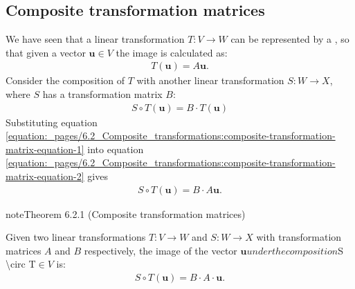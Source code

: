 \documentclass[letterpaper,10pt,english]{jupyterBook}
\begin{document}
\subsection{Composite transformation matrices}
\label{\detokenize{_pages/6.2_Composite_transformations:composite-transformation-matrices}}
\sphinxAtStartPar
We have seen that a linear transformation \(T: V \to W\) can be represented by a {\hyperref[\detokenize{_pages/6.1_Transformation_matrices:transformation-matrix-definition}]{}}, so that given a vector \(\mathbf{u} \in V\) the image is calculated as:
\begin{equation}\label{equation:_pages/6.2_Composite_transformations:composite-transformation-matrix-equation-1}
\begin{split} T(\mathbf{u}) = A \mathbf{u}. \end{split}
\end{equation}
\sphinxAtStartPar
Consider the composition of \(T\) with another linear transformation \(S: W \to X\), where \(S\) has a transformation matrix \(B\):
\begin{equation}\label{equation:_pages/6.2_Composite_transformations:composite-transformation-matrix-equation-2}
\begin{split} S \circ T(\mathbf{u}) = B \cdot T(\mathbf{u}) \end{split}
\end{equation}
\sphinxAtStartPar
Substituting equation \eqref{equation:_pages/6.2_Composite_transformations:composite-transformation-matrix-equation-1} into equation \eqref{equation:_pages/6.2_Composite_transformations:composite-transformation-matrix-equation-2} gives
\begin{equation*}
\begin{split} S \circ T (\mathbf{u}) = B \cdot A \mathbf{u}. \end{split}
\end{equation*}\label{_pages/6.2_Composite_transformations:composite-transformation-matrices-theorem}
\begin{sphinxadmonition}{note}{Theorem 6.2.1 (Composite transformation matrices)}



\sphinxAtStartPar
Given two linear transformations \(T:V \to W\) and \(S:W \to X\) with transformation matrices \(A\) and \(B\) respectively, the image of the vector \(\mathbf{u} under the composition \)S \textbackslash{}circ T\(  \in V\) is:
\begin{equation}\label{equation:_pages/6.2_Composite_transformations:composite-transformation-matrices-theorem-equation}
\begin{split} S \circ T (\mathbf{u}) = B \cdot A \cdot \mathbf{u}. \end{split}
\end{equation}\end{sphinxadmonition}
\end{document}
